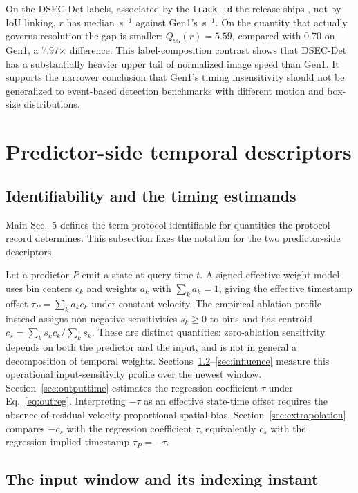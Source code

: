 \documentclass[10pt,twocolumn,letterpaper]{article}
\begin{document}
On the DSEC-Det labels, associated by the \texttt{track\_id} the release ships
, not by IoU linking, $r$ has median \rDsecTrain\,s$^{-1}$ against Gen1's
\rGenAll\,s$^{-1}$. On the quantity that actually governs resolution the gap is smaller:
$Q_{95}(r)=5.59$, compared with 0.70 on Gen1, a 7.97$\times$ difference. This
label-composition contrast shows that DSEC-Det has a substantially heavier upper tail of
normalized image speed than Gen1. It supports the narrower conclusion that Gen1's timing
insensitivity should not be generalized to event-based detection benchmarks with different
motion and box-size distributions.

\section{Predictor-side temporal descriptors}
\label{sec:predictor}

\subsection{Identifiability and the timing estimands}

Main Sec.~5 defines the term protocol-identifiable for quantities the protocol record determines. This subsection fixes the notation for the two predictor-side
descriptors.

Let a predictor $P$ emit a state at query time $t$. A signed effective-weight
model uses bin centers $c_k$ and weights $a_k$ with $\sum_k a_k=1$, giving the
effective timestamp offset $\tau_P=\sum_k a_kc_k$ under constant velocity. The
empirical ablation profile instead assigns non-negative sensitivities $s_k\geq0$
to bins and has centroid $c_s=\sum_k s_kc_k/\sum_k s_k$. These are distinct
quantities: zero-ablation sensitivity depends on both the predictor and the
input, and is not in general a decomposition of temporal weights. Sections~\ref{sec:window}--\ref{sec:influence} measure this
operational input-sensitivity profile over the newest window. Section~\ref{sec:outputtime}
estimates the regression coefficient $\tau$ under Eq.~\ref{eq:outreg}. Interpreting $-\tau$ as an
effective state-time offset requires the absence of residual velocity-proportional
spatial bias.
Section~\ref{sec:extrapolation} compares $-c_s$ with the regression coefficient
$\tau$, equivalently $c_s$ with the regression-implied timestamp $\tau_P=-\tau$.

\subsection{The input window and its indexing instant}
\label{sec:window}
\end{document}
